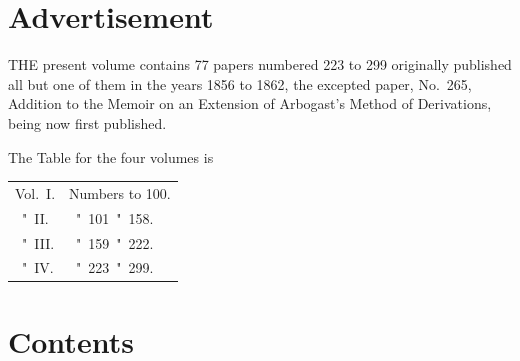 \documentclass[11pt,a4paper]{book}
\begin{document}
\chapter*{Advertisement}
\thispagestyle{empty}

THE present volume contains 77 papers numbered 223 to 299 originally published all but one of them in the years 1856 to 1862, the excepted paper, No.~265, Addition to the Memoir on an Extension of Arbogast's Method of Derivations, being now first published.

The Table for the four volumes is

\begin{center}
\begin{tabular}{ll}
Vol.\ I. & Numbers \quad 1 to 100. \\
\phantom{Vol.}\ "\ II. & \phantom{Numbers}\ "\ 101\ "\ 158. \\
\phantom{Vol.}\ "\ III. & \phantom{Numbers}\ "\ 159\ "\ 222. \\
\phantom{Vol.}\ "\ IV. & \phantom{Numbers}\ "\ 223\ "\ 299. \\
\end{tabular}
\end{center}
\newpage

\thispagestyle{empty}
\mbox{}
\newpage

\chapter*{Contents}
\thispagestyle{empty}
\end{document}
